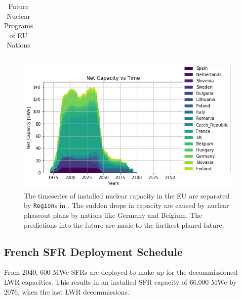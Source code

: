 \begin{table}[h]
\begin{tabularx}{\textwidth}{lmb}
        \end{tabularx}

    \caption {Future Nuclear Programs of \gls{EU} Nations \cite{world_nuclear_association_nuclear_2017}}
  \label{tab:eu_growth}
\end{table}
\FloatBarrier

\begin{figure}[htbp!]
    \begin{center}
        \includegraphics[scale=0.7]{./images/eu_future/power_plot.png}
    \end{center}
    \caption{The timeseries of installed nuclear capacity in the EU are separated by \texttt{Region}s in \Cyclus.
             The sudden drops in capacity are caused by nuclear phaseout plans by nations like Germany and Belgium.
             The predictions into the future are made to the farthest planed future.
             }
    \label{fig:eu_pow}
\end{figure}



\subsection{French \gls{SFR} Deployment Schedule}

From 2040,
600-\gls{MWe} \glspl{SFR} are deployed to make up for the 
decommissioned \gls{LWR} capacities. 
This results in an installed \gls{SFR} capacity of 66,000 \gls{MWe}
 by 2076, when the last \gls{LWR} decommissions.

